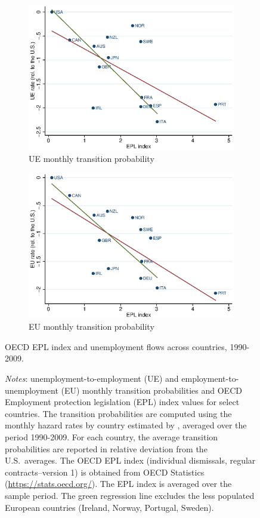 \documentclass[12pt]{article} %
\theoremstyle{plain}
\theoremstyle{definition}
\begin{document}
	\begin{figure}[!h]
	\begin{subfigure}{.5\textwidth}
		\centering		\includegraphics[width=1\linewidth]{Figure_3a.eps}
		\caption{UE monthly transition probability}
	\end{subfigure}
	\begin{subfigure}{.5\textwidth}
		\centering
		\includegraphics[width=1\linewidth]{Figure_3b.eps}
		\caption{EU monthly transition probability}
	\end{subfigure}
	\caption{OECD EPL index and unemployment flows across countries, 1990-2009.}
			\caption*{
		\footnotesize \textit{Notes}: unemployment-to-employment (UE) and employment-to-unemployment (EU) monthly transition probabilities and OECD Employment protection legislation (EPL) index values for select countries. The transition probabilities are computed using the monthly hazard rates by country estimated by \cite*{elsby_hobijn_sahin_2013_Restat}, averaged over the period 1990-2009. For each country, the average transition probabilities are reported in relative deviation from the U.S.\ averages. The OECD EPL index (individual dismissals, regular contracts--version 1) is obtained from OECD Statistics (\url{https://stats.oecd.org/}). The EPL index is averaged over the sample period. The green regression line excludes the less populated European countries (Ireland, Norway, Portugal, Sweden).}
	\label{fig:fig_3}
	\end{figure}
	
\end{document}
